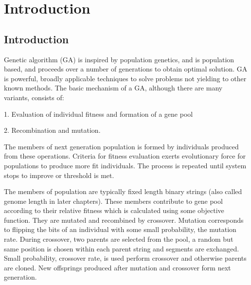 \chapter{Introduction} \label{ch:introduction}

\section{Introduction}
Genetic algorithm (GA) is inspired by population genetics, and is population based, and 
proceeds over a number of generations to obtain optimal solution. GA is powerful, broadly applicable 
techniques to solve problems not yielding to other known methods. The basic mechanism of a GA, 
although there are many variants, consists of:

1. Evaluation of individual fitness and formation of a gene pool

2. Recombination and mutation.

The members of next generation population is formed by individuals produced from these operations. 
Criteria for fitness evaluation exerts evolutionary force for populations to produce more fit individuals. 
The process is repeated until system stops to improve or threshold is met.

The members of population are typically fixed length binary strings (also called genome length in later chapters). 
These members contribute to gene pool according to their relative fitness which is calculated using some objective function. 
They are mutated and recombined by crossover. Mutation corresponds to flipping the bits of an individual with some small probability, 
the mutation rate. During crossover, two parents are selected from the pool, a random but same position is chosen within 
each parent string and segments are exchanged. Small probability, crossover rate, is used perform crossover and otherwise 
parents are cloned. New offsprings produced after mutation and crossover form next generation.

